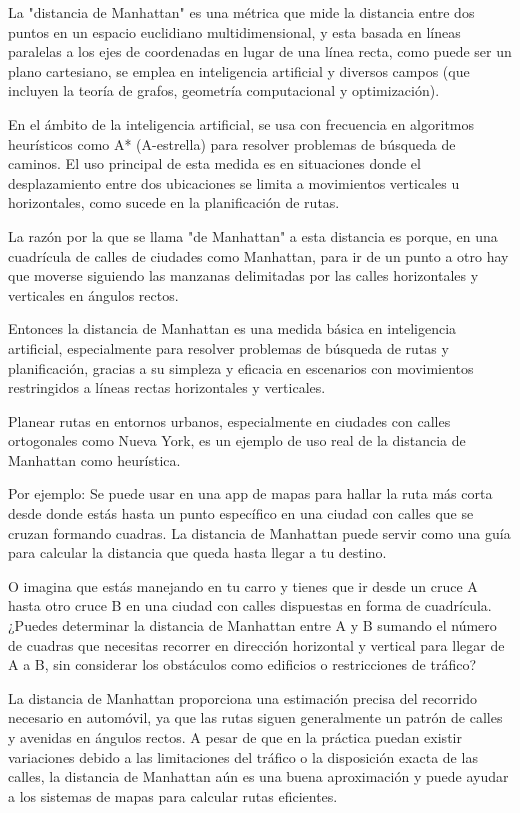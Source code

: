 La "distancia de Manhattan" es una métrica que mide la distancia entre dos puntos en un espacio euclidiano multidimensional, y esta basada en líneas paralelas a los ejes de coordenadas en lugar de una línea recta, como puede ser un plano cartesiano, se emplea en inteligencia artificial y diversos campos (que incluyen la teoría de grafos, geometría computacional y optimización).

En el ámbito de la inteligencia artificial, se usa con frecuencia en algoritmos heurísticos como A* (A-estrella) para resolver problemas de búsqueda de caminos. El uso principal de esta medida es en situaciones donde el desplazamiento entre dos ubicaciones se limita a movimientos verticales u horizontales, como sucede en la planificación de rutas.

La razón por la que se llama "de Manhattan" a esta distancia es porque, en una cuadrícula de calles de ciudades como Manhattan, para ir de un punto a otro hay que moverse siguiendo las manzanas delimitadas por las calles horizontales y verticales en ángulos rectos.

Entonces la distancia de Manhattan es una medida básica en inteligencia artificial, especialmente para resolver problemas de búsqueda de rutas y planificación, gracias a su simpleza y eficacia en escenarios con movimientos restringidos a líneas rectas horizontales y verticales.

Planear rutas en entornos urbanos, especialmente en ciudades con calles ortogonales como Nueva York, es un ejemplo de uso real de la distancia de Manhattan como heurística.

Por ejemplo: Se puede usar en una app de mapas para hallar la ruta más corta desde donde estás hasta un punto específico en una ciudad con calles que se cruzan formando cuadras. La distancia de Manhattan puede servir como una guía para calcular la distancia que queda hasta llegar a tu destino.

O imagina que estás manejando en tu carro y tienes que ir desde un cruce A hasta otro cruce B en una ciudad con calles dispuestas en forma de cuadrícula. ¿Puedes determinar la distancia de Manhattan entre A y B sumando el número de cuadras que necesitas recorrer en dirección horizontal y vertical para llegar de A a B, sin considerar los obstáculos como edificios o restricciones de tráfico?

La distancia de Manhattan proporciona una estimación precisa del recorrido necesario en automóvil, ya que las rutas siguen generalmente un patrón de calles y avenidas en ángulos rectos. A pesar de que en la práctica puedan existir variaciones debido a las limitaciones del tráfico o la disposición exacta de las calles, la distancia de Manhattan aún es una buena aproximación y puede ayudar a los sistemas de mapas para calcular rutas eficientes.

